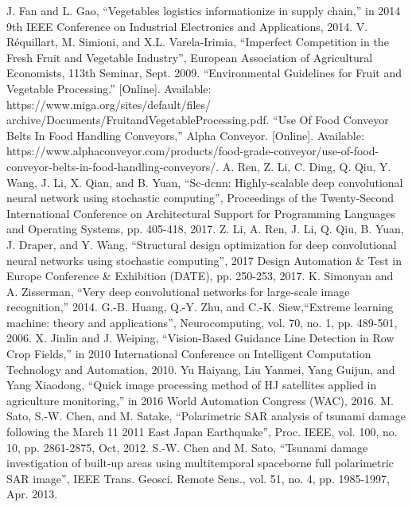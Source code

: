 \documentclass[conference,table]{IEEEtran}
\begin{document}
	\begin{thebibliography}{00}
		 J. Fan and L. Gao, ``Vegetables logistics informationize in supply chain,'' in 2014 9th IEEE Conference on Industrial Electronics and Applications, 2014.
		 V. Réquillart, M. Simioni, and X.L. Varela-Irimia, ``Imperfect Competition in the Fresh Fruit and Vegetable Industry'', European Association of Agricultural Economists, 113th Seminar, Sept. 2009.
		 ``Environmental Guidelines for Fruit and Vegetable Processing.'' [Online]. Available: https://www.miga.org/sites/default/files/ archive/Documents/FruitandVegetableProcessing.pdf.
		 ``Use Of Food Conveyor Belts In Food Handling Conveyors,'' Alpha Conveyor. [Online]. Available: https://www.alphaconveyor.com/products/food-grade-conveyor/use-of-food-conveyor-belts-in-food-handling-conveyors/.
		 A. Ren, Z. Li, C. Ding, Q. Qiu, Y. Wang, J. Li, X. Qian, and B. Yuan, ``Sc-dcnn: Highly-scalable deep convolutional neural network using stochastic computing'', Proceedings of the Twenty-Second International Conference on Architectural Support for Programming Languages and Operating Systems, pp. 405-418, 2017.
		 Z. Li, A. Ren, J. Li, Q. Qiu, B. Yuan, J. Draper, and Y. Wang, ``Structural design optimization for deep convolutional neural networks using stochastic computing'', 2017 Design Automation \& Test in Europe Conference \& Exhibition (DATE), pp. 250-253, 2017.
		 K. Simonyan and A. Zisserman, ``Very deep convolutional networks for large-scale image recognition,'' 2014.
		 G.-B. Huang, Q.-Y. Zhu, and C.-K. Siew,``Extreme learning machine: theory and applications'', Neurocomputing, vol. 70, no. 1, pp. 489-501, 2006.
		 X. Jinlin and J. Weiping, ``Vision-Based Guidance Line Detection in Row Crop Fields,'' in 2010 International Conference on Intelligent Computation Technology and Automation, 2010.
		 Yu Haiyang, Liu Yanmei, Yang Guijun, and Yang Xiaodong, ``Quick image processing method of HJ satellites applied in agriculture monitoring,'' in 2016 World Automation Congress (WAC), 2016.
		 M. Sato, S.-W. Chen, and M. Satake, ``Polarimetric SAR analysis of tsunami damage following the March 11 2011 East Japan Earthquake'', Proc. IEEE, vol. 100, no. 10, pp. 2861-2875, Oct, 2012.
		 S.-W. Chen and M. Sato, ``Tsunami damage investigation of built-up areas using multitemporal spaceborne full polarimetric SAR image'', IEEE Trans. Geosci. Remote Sens., vol. 51, no. 4, pp. 1985-1997, Apr. 2013.

\end{thebibliography}
\end{document}
